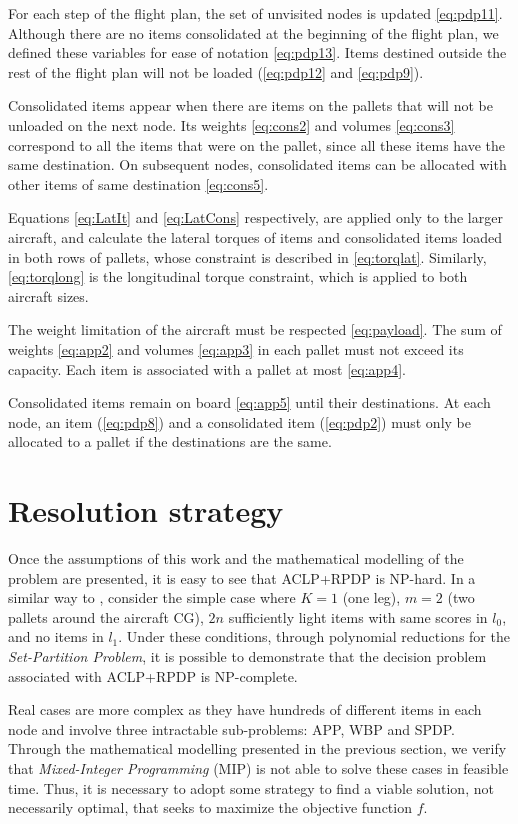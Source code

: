 \documentclass[preprint,authoryear]{elsarticle}
\begin{document}
For each step of the flight plan, the set of unvisited nodes is updated \ref{eq:pdp11}. Although there are no items consolidated at the beginning of the flight plan, we defined these variables for ease of notation \ref{eq:pdp13}. Items destined outside the rest of the flight plan will not be loaded (\ref{eq:pdp12} and \ref{eq:pdp9}).

Consolidated items appear when there are items on the pallets that will not be unloaded on the next node. Its weights \ref{eq:cons2} and volumes \ref{eq:cons3} correspond to all the items that were on the pallet, since all these items have the same destination. On subsequent nodes, consolidated items can be allocated with other items of same destination \ref{eq:cons5}.

Equations \ref{eq:LatIt} and \ref{eq:LatCons} respectively, are applied only to the larger aircraft, and calculate the lateral torques of items and consolidated items loaded in both rows of pallets, whose constraint is described in \ref{eq:torqlat}. Similarly, \ref{eq:torqlong} is the longitudinal torque constraint, which is applied to both aircraft sizes.

The weight limitation of the aircraft must be respected \ref{eq:payload}. The sum of weights \ref{eq:app2} and volumes \ref{eq:app3} in each pallet must not exceed its capacity. Each item is associated with a pallet at most \ref{eq:app4}.

Consolidated items remain on board \ref{eq:app5} until their destinations. At each node, an item (\ref{eq:pdp8}) and a consolidated item (\ref{eq:pdp2}) must only be allocated to a pallet if the destinations are the same.


\section{Resolution strategy}
\label{sec5}

Once the assumptions of this work and the mathematical modelling of the problem are presented, it is easy to see that ACLP+RPDP is NP-hard. In a similar way to \cite[p. 6]{LurkinSchyns2015}, consider the simple case where $K=1$\/ (one leg), $m=2$ (two pallets around the aircraft CG), $2n$\/ sufficiently light items with same scores in $l_0$, and no items in $l_1$. Under these conditions, through polynomial reductions for the {\it Set-Partition Problem}, it is possible to demonstrate that the decision problem associated with ACLP+RPDP is NP-complete.

Real cases are more complex as they have hundreds of different items in each node and involve three intractable sub-problems: APP, WBP and SPDP. Through the mathematical modelling presented in the previous section, we verify that {\it Mixed-Integer Programming}\/ (MIP) is not able to solve these cases in feasible time. Thus, it is necessary to adopt some strategy to find a viable solution, not necessarily optimal, that seeks to maximize the objective function $f$.
\end{document}
